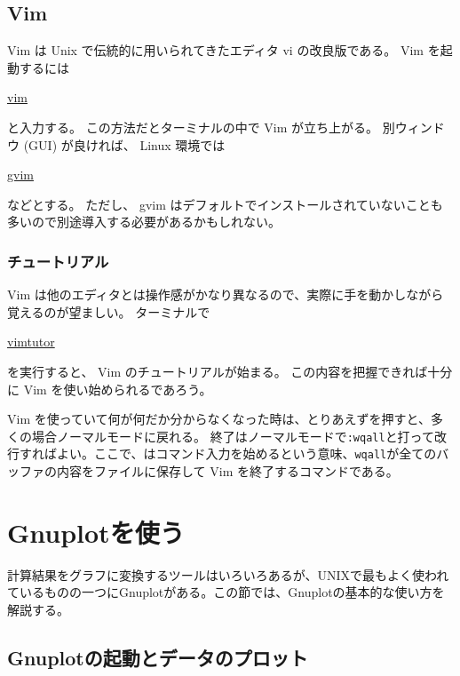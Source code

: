 \subsection{Vim}
Vim は Unix で伝統的に用いられてきたエディタ vi の改良版である。
Vim を起動するには
\begin{commandline2}
\prompt \underline{vim}
\end{commandline2}
と入力する。
この方法だとターミナルの中で Vim が立ち上がる。
別ウィンドウ (GUI) が良ければ、 Linux 環境では
\begin{commandline2}
\prompt \underline{gvim}
\end{commandline2}
などとする。
ただし、 gvim はデフォルトでインストールされていないことも多いので別途導入する必要があるかもしれない。

\subsubsection{チュートリアル}
Vim は他のエディタとは操作感がかなり異なるので、実際に手を動かしながら覚えるのが望ましい。
ターミナルで
\begin{commandline2}
\prompt \underline{vimtutor}
\end{commandline2}
を実行すると、 Vim のチュートリアルが始まる。
この内容を把握できれば十分に Vim を使い始められるであろう。

Vim を使っていて何が何だか分からなくなった時は、とりあえずを押すと、多くの場合ノーマルモードに戻れる。
終了はノーマルモードで\texttt{:wqall}と打って改行すればよい。ここで、\ovalbox{:}はコマンド入力を始めるという意味、\texttt{wqall}が全てのバッファの内容をファイルに保存して Vim を終了するコマンドである。


\section{Gnuplotを使う}
\label{sec:unix:gnuplot}

計算結果をグラフに変換するツールはいろいろあるが、UNIXで最もよく使われているものの一つにGnuplotがある。この節では、Gnuplotの基本的な使い方を解説する。

\subsection{Gnuplotの起動とデータのプロット}

